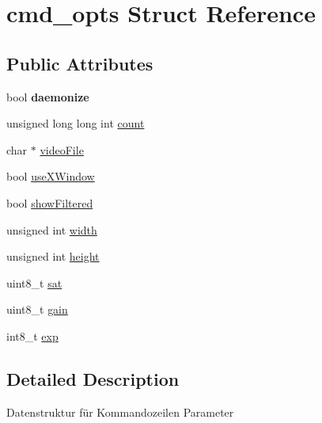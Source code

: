 \hypertarget{structcmd__opts}{\section{cmd\+\_\+opts Struct Reference}
\label{structcmd__opts}
}
\subsection*{Public Attributes}
\begin{DoxyCompactItemize}
\item 
\hypertarget{structcmd__opts_a0e94dcdbf5c755d97477c346ece96a2e}{bool {\bfseries daemonize}}\label{structcmd__opts_a0e94dcdbf5c755d97477c346ece96a2e}

\item 
unsigned long long int \hyperlink{structcmd__opts_a582f29b5e8c3328779e88bcb22ff3c2e}{count}
\item 
char $\ast$ \hyperlink{structcmd__opts_acee5a1c6793898bbda38d6d7fb5de431}{video\+File}
\item 
bool \hyperlink{structcmd__opts_aee44e8161de659e8fff50e09100f9ada}{use\+X\+Window}
\item 
bool \hyperlink{structcmd__opts_ab2a0a976837dc40909f765546c60c4c9}{show\+Filtered}
\item 
unsigned int \hyperlink{structcmd__opts_a0f13b6290e7e33c22a258c11ed23f72f}{width}
\item 
unsigned int \hyperlink{structcmd__opts_a0ab9c9cf886559f8cf19dd2f7be072fb}{height}
\item 
uint8\+\_\+t \hyperlink{structcmd__opts_aa83f2910f6a1803ee8c9f9e3581db314}{sat}
\item 
uint8\+\_\+t \hyperlink{structcmd__opts_a55323cae5dfbafe672e6581da99985b9}{gain}
\item 
int8\+\_\+t \hyperlink{structcmd__opts_aa6ef1ebf0fbaa8bd7016a8ef1a2c5ef4}{exp}
\end{DoxyCompactItemize}


\subsection{Detailed Description}
Datenstruktur für Kommandozeilen Parameter 

